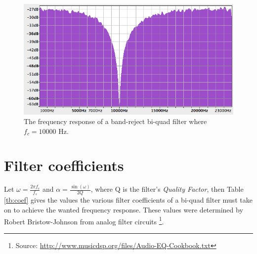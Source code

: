 \documentclass[12pt,twoside]{report}
\begin{document}
\begin{figure}[p!]
  \includegraphics[scale=0.6]{img/bandreject}
  \caption{The frequency response of a band-reject bi-quad filter where $f_{c} = 10000$ Hz.}
  \label{fig:bandreject}
\end{figure}

\pagebreak

\section{Filter coefficients}

Let $\omega = \frac{2\pi f_{c}}{f_{s}}$ and $\alpha = \frac{\sin(\omega)}{2Q}$, where Q is the filter's \emph{Quality Factor}\footnotemark{}, then Table \ref{tb:coef} gives the values the various filter coefficients of a bi-quad filter must take on to achieve the wanted frequency response. These values were determined by Robert Bristow-Johnson from analog filter circuits \footnote{Source: \url{http://www.musicdsp.org/files/Audio-EQ-Cookbook.txt}}.

\end{document}
